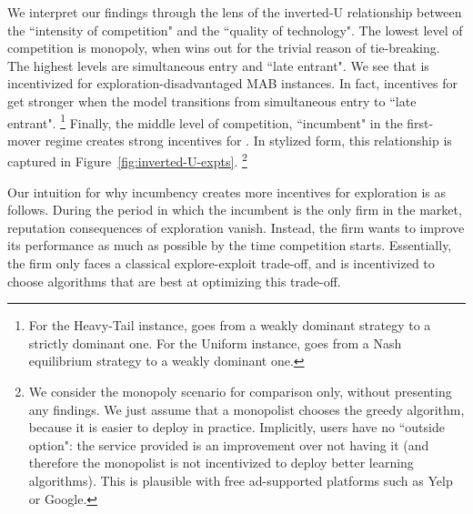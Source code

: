 \documentclass[../competing_bandits_with_appendix.tex]{subfiles}
\begin{document}
We interpret our findings through the lens of the inverted-U relationship between the ``intensity of competition" and the ``quality of technology". The lowest level of competition is monopoly, when \DynamicGreedy wins out for the trivial reason of tie-breaking. The highest levels are simultaneous entry and ``late entrant". We see that \DynamicGreedy is incentivized for exploration-disadvantaged MAB instances. In fact, incentives for \DynamicGreedy get stronger when the model transitions from simultaneous entry to ``late entrant".%
\footnote{For the Heavy-Tail instance, \DynamicGreedy goes from a weakly dominant strategy to a strictly dominant one. For the Uniform instance, \DynamicGreedy goes from a Nash equilibrium strategy to a weakly dominant one.}
Finally, the middle level of competition, ``incumbent" in the first-mover regime creates strong incentives for \Thompson. In stylized form, this relationship is captured in Figure~\ref{fig:inverted-U-expts}.%
\footnote{We consider the monopoly scenario for comparison only, without presenting any findings. We just assume that a monopolist chooses
the greedy algorithm, because it is easier to deploy in practice. Implicitly, users have no ``outside option": the service provided is an improvement over not having it (and therefore the monopolist is not incentivized to deploy better learning algorithms). This is plausible with free ad-supported platforms such as Yelp or Google.}



Our intuition for why incumbency creates more incentives for exploration is as follows. During the period in which the incumbent is the only firm in the market, reputation consequences of exploration vanish. Instead, the firm wants to improve its performance as much as possible by the time competition starts. Essentially, the firm only faces a classical explore-exploit trade-off, and is incentivized to choose algorithms that are best at optimizing this trade-off.
\end{document}
